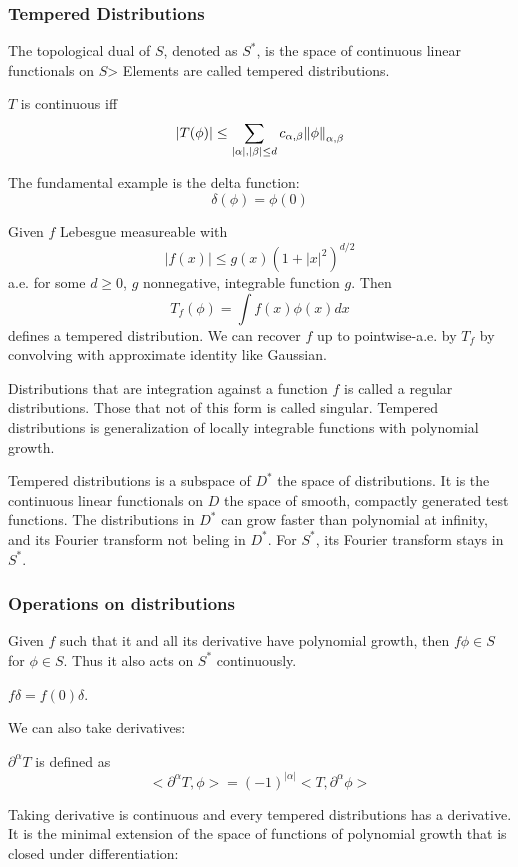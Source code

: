 \documentclass[main.tex]{subfiles}
\begin{document}
\subsubsection{Tempered Distributions}
The topological dual of $S$, denoted as $S^*$, is the space of continuous linear functionals on $S$> Elements are called tempered distributions. 

$T$ is continuous iff 
$$
|T (\phi)| \leq \sum_{|\alpha|, |\beta| \leq d} c_{\alpha, \beta} \norm{\phi}_{\alpha, \beta}
$$

\begin{example}
The fundamental example is the delta function: 
$$
\delta(\phi) = \phi(0)
$$
\end{example}

Given $f$ Lebesgue measureable with 
$$
|f(x)| \leq g(x) (1 + |x|^2)^{d/2}
$$
a.e. for some $d \geq 0$, $g$ nonnegative, integrable function $g$. Then 
$$
T_f(\phi) = \int f(x) \phi(x) dx
$$
defines a tempered distribution. We can recover $f$ up to pointwise-a.e. by $T_f$ by convolving with approximate identity like Gaussian.

Distributions that are integration against a function $f$ is called a regular distributions. Those that not of this form is called singular. Tempered distributions is generalization of locally integrable functions with polynomial growth. 

Tempered distributions is a subspace of $D^*$ the space of distributions. It is the continuous linear functionals on $D$ the space of smooth, compactly generated test functions. The distributions in $D^*$ can grow faster than polynomial at infinity, and its Fourier transform not beling in $D^*$. For $S^*$, its Fourier transform stays in $S^*$.

\subsubsection{Operations on distributions}
Given $f$ such that it and all its derivative have polynomial growth, then $f\phi \in S$ for $\phi \in S$. Thus it also acts on $S^*$ continuously.

$f \delta = f(0) \delta$. 

We can also take derivatives:

\begin{definition}
$\partial^\alpha T$ is defined as 
$$
<\partial^\alpha T, \phi> = (-1)^{|\alpha|}<T, \partial^\alpha \phi>
$$
\end{definition}
Taking derivative is continuous and every tempered distributions has a derivative. It is the minimal extension of the space of functions of polynomial growth that is closed under differentiation:
\end{document}
